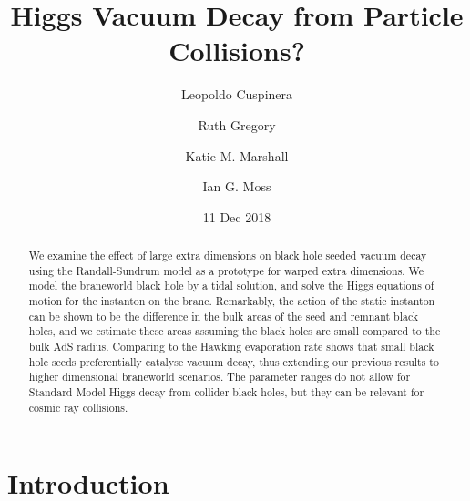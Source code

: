 \documentclass[aps,12pt,prd,superscriptaddress,preprintnumbers, 
	amssymb,
	amsmath,
	notitlepage,
	longbibliography,
	nofootinbib]{revtex4-1}
\begin{document}
\title{Higgs Vacuum Decay from Particle Collisions?}
\date{11 Dec 2018} 


\author{Leopoldo Cuspinera}
\author{Ruth Gregory}
\author{Katie M. Marshall}
\author{Ian G. Moss}

\begin{abstract}
We examine the effect of large extra dimensions on black hole seeded
vacuum decay using the Randall-Sundrum model as a prototype for warped
extra dimensions. We model the braneworld black hole by a tidal solution,
and solve the Higgs equations of motion for the instanton on the brane. 
Remarkably, the action of the static instanton can be shown to be the
difference in the bulk areas of the seed and remnant black holes, and we
estimate these areas assuming the black holes are small compared to the
bulk AdS radius. Comparing to the Hawking evaporation rate shows that 
small black hole seeds preferentially catalyse vacuum decay, thus extending
our previous results to higher dimensional braneworld scenarios. The
parameter ranges do not allow for Standard Model Higgs decay from
collider black holes, but they can be relevant for cosmic ray collisions.
\end{abstract}






\maketitle

\newpage
\section{Introduction}
\end{document}
